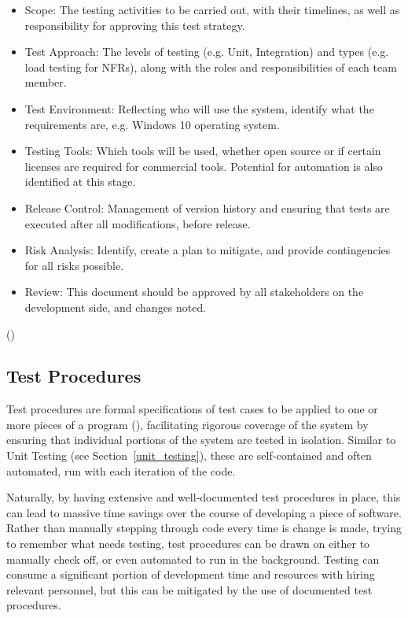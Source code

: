\documentclass[12pt]{article}
\begin{document}
\begin{itemize}
  \item Scope: The testing activities to be carried out, with their timelines, as well as responsibility for approving this test strategy.
  \item Test Approach: The levels of testing (e.g. Unit, Integration) and types (e.g. load testing for NFRs), along with the roles and responsibilities of each team member.
  \item Test Environment: Reflecting who will use the system, identify what the requirements are, e.g. Windows 10 operating system.
  \item Testing Tools: Which tools will be used, whether open source or if certain licenses are required for commercial tools. Potential for automation is also identified at this stage.
  \item Release Control: Management of version history and ensuring that tests are executed after all modifications, before release.
  \item Risk Analysis: Identify, create a plan to mitigate, and provide contingencies for all risks possible.
  \item Review: This document should be approved by all stakeholders on the development side, and changes noted.
\end{itemize}
()


\subsection{Test Procedures}

Test procedures are formal specifications of test cases to be applied to one or more pieces of a program (), facilitating rigorous coverage of the system by ensuring that individual portions of the system are tested in isolation. Similar to Unit Testing (see Section~\ref{unit_testing}), these are self-contained and often automated, run with each iteration of the code. 

Naturally, by having extensive and well-documented test procedures in place, this can lead to massive time savings over the course of developing a piece of software. Rather than manually stepping through code every time is change is made, trying to remember what needs testing, test procedures can be drawn on either to manually check off, or even automated to run in the background. Testing can consume a significant portion of development time and resources with hiring relevant personnel, but this can be mitigated by the use of documented test procedures.
\end{document}
